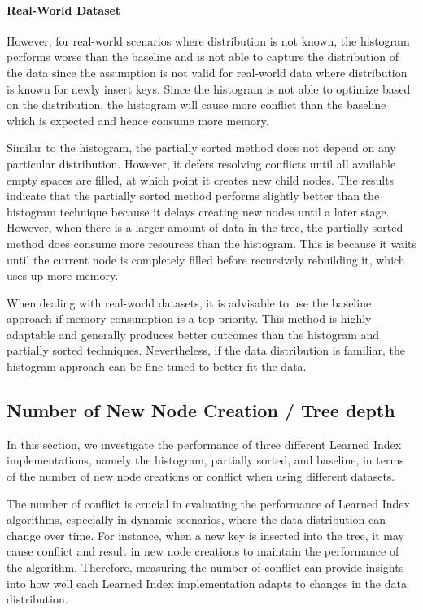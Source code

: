 \documentclass[11pt,a4paper]{article}
\newcommand{\learnindex}{\textsf{Learned Index}\xspace}
\newcommand{\conflict}{\textsf{conflict}\xspace}
\begin{document}
\paragraph{Real-World Dataset}

However, for real-world scenarios where distribution is not known, the histogram performs worse than the baseline and is not able to capture the distribution of the data since the assumption is not valid for real-world data where distribution is known for newly insert keys. Since the histogram is not able to optimize based on the distribution, the histogram will cause more \conflict than the baseline which is expected and hence consume more memory. 

Similar to the histogram, the partially sorted method does not depend on any particular distribution. However, it defers resolving conflicts until all available empty spaces are filled, at which point it creates new child nodes. The results indicate that the partially sorted method performs slightly better than the histogram technique because it delays creating new nodes until a later stage. However, when there is a larger amount of data in the tree, the partially sorted method does consume more resources than the histogram. This is because it waits until the current node is completely filled before recursively rebuilding it, which uses up more memory.

When dealing with real-world datasets, it is advisable to use the baseline approach if memory consumption is a top priority. This method is highly adaptable and generally produces better outcomes than the histogram and partially sorted techniques. Nevertheless, if the data distribution is familiar, the histogram approach can be fine-tuned to better fit the data. 

\subsection{Number of New Node Creation / Tree depth}
In this section, we investigate the performance of three different \learnindex implementations, namely the histogram, partially sorted, and baseline, in terms of the number of new node creations or \conflict when using different datasets.

The number of \conflict is crucial in evaluating the performance of \learnindex algorithms, especially in dynamic scenarios, where the data distribution can change over time. For instance, when a new key is inserted into the tree, it may cause \conflict and result in new node creations to maintain the performance of the algorithm. Therefore, measuring the number of \conflict can provide insights into how well each \learnindex implementation adapts to changes in the data distribution.
\end{document}

